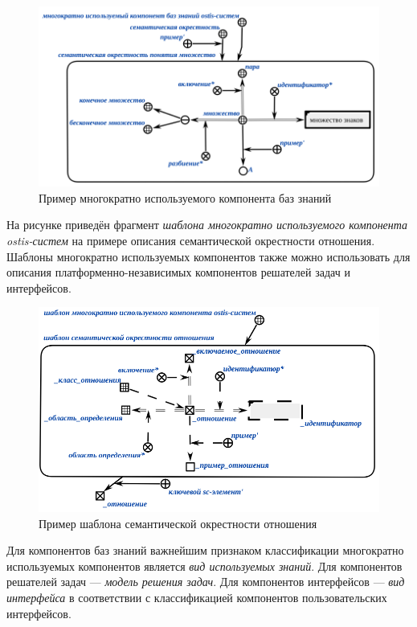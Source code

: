 \begin{figure}[H]
	\includegraphics[scale=0.6]{author/part5/figures/set_neighbourhood.png}
	\caption{Пример многократно используемого компонента баз знаний}
	\label{fig:set_neighbourhood}
\end{figure}

На рисунке \textit{} приведён фрагмент \textit{шаблона многократно используемого компонента ostis-систем} на примере описания семантической окрестности отношения. Шаблоны многократно используемых компонентов также можно использовать для описания платформенно-независимых компонентов решателей задач и интерфейсов.

\begin{figure}[H]
	\includegraphics[scale=0.6]{author/part5/figures/relation_template.png}
	\caption{Пример шаблона семантической окрестности отношения}
	\label{fig:relation_template}
\end{figure}

Для компонентов баз знаний важнейшим признаком классификации многократно используемых компонентов является \textit{вид используемых знаний}. Для компонентов решателей задач --- \textit{модель решения задач}. Для компонентов интерфейсов --- \textit{вид интерфейса} в соответствии с классификацией компонентов пользовательских интерфейсов.

